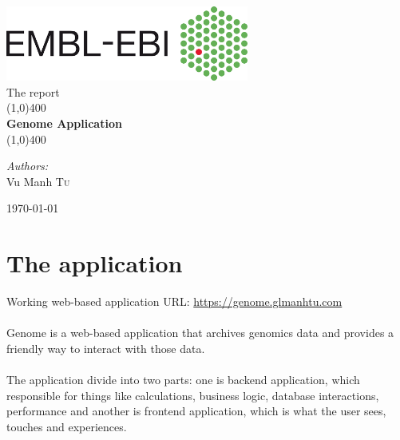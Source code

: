 \documentclass[a4paper,12pt]{article}
\begin{document}
\begin{titlepage}
	\begin{center}
\includegraphics[width=0.6\textwidth]{images/Ebi_official_logo}\\[1cm]

{\Large The report}\\[0.5cm]	
	
	\line(1,0){400}\\[0.2in]
	\huge{\bfseries Genome Application}\\
	\line(1,0){400}\\[1.5cm]
	\noindent	
	

	
		\begin{center} \large
    	\emph{Authors:}\\
    	Vu Manh \textsc{Tu}\\
		\end{center}

\vfill

{\large \today}
	\end{center}
\end{titlepage}

\tableofcontents
\thispagestyle{empty}
\clearpage

\section{The application}
Working web-based application URL: \url{https://genome.glmanhtu.com}\\\\
Genome is a web-based application that archives genomics data and provides a friendly way to interact with those data.\\\\
The application divide into two parts: one is backend application, which responsible for things like calculations, business logic, database interactions, performance and another is frontend application, which is what the user sees, touches and experiences.
\end{document}
